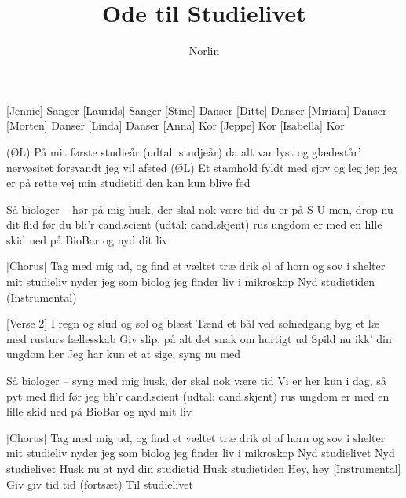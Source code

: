 \documentclass[a4paper,11pt]{article}
\title{Ode til Studielivet}
\author{Norlin}
\begin{document}
\maketitle

\begin{roles}
    [Jennie] Sanger
    [Laurids] Sanger
    [Stine] Danser
    [Ditte] Danser
    [Miriam] Danser
    [Morten] Danser
    [Linda] Danser
    [Anna] Kor
    [Jeppe] Kor
    [Isabella] Kor
\end{roles}

 


\begin{song}
 
(ØL) På mit første studieår (udtal: studjeår)
da alt var lyst og glædestår’
nervøsitet forsvandt jeg vil afsted
(ØL) Et stamhold fyldt med sjov og leg
jep jeg er på rette vej
min studietid den kan kun blive fed

Så biologer -- hør på mig
husk, der skal nok være tid
du er på S U men, drop nu dit flid
før du bli’r cand.scient (udtal: cand.skjent)
rus ungdom er med en lille skid
ned på BioBar og nyd dit liv

[Chorus]
Tag med mig ud, og find et væltet træ
drik øl af horn og sov i shelter
mit studieliv nyder jeg som biolog
jeg finder liv i mikroskop
Nyd studietiden
(Instrumental)

[Verse 2]
I regn og slud og sol og blæst
Tænd et bål ved solnedgang
byg et læ med rusturs fællesskab
Giv slip, på alt det snak om hurtigt ud
Spild nu ikk’ din ungdom her
Jeg har kun et at sige, syng nu med

Så biologer -- syng med mig
husk, der skal nok være tid
Vi er her kun i dag, så pyt med flid
før jeg bli’r cand.scient (udtal: cand.skjent)
rus ungdom er med en lille skid
ned på BioBar og nyd mit liv

[Chorus]
Tag med mig ud, og find et væltet træ
drik øl af horn og sov i shelter
mit studieliv nyder jeg som biolog
jeg finder liv i mikroskop
Nyd studielivet
Nyd studielivet
Husk nu at nyd din studietid
Husk studietiden
Hey, hey
 [Instrumental]
Giv giv
tid tid
(fortsæt)
Til studielivet


\end{song}
\end{document}
